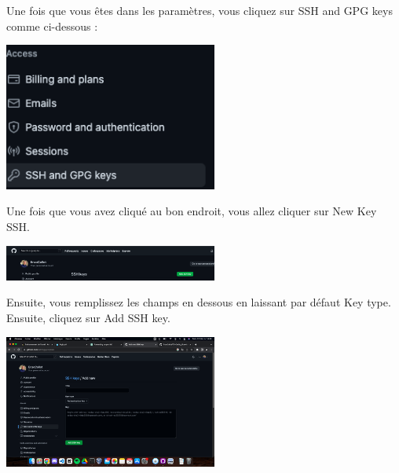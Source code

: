 \documentclass[12pt]{article}
\begin{document}
\vspace{0.3cm}

Une fois que vous êtes dans les paramètres, vous cliquez sur SSH and GPG keys comme ci-dessous :

\vspace{0.3cm}

\begin{center}
  \includegraphics[width=7cm]{Image-TD-Git-5/ssh-gpg.png}
\end{center}

Une fois que vous avez cliqué au bon endroit, vous allez cliquer sur New Key SSH.

\vspace{0.3cm}

\begin{center}
  \includegraphics[width=7cm]{Image-TD-Git-5/new-ssh-key.png}
\end{center}

\vspace{0.3cm}

Ensuite, vous remplissez les champs en dessous en laissant par défaut Key type. Ensuite, cliquez sur Add SSH key.

\vspace{0.3cm}

\begin{center}
  \includegraphics[width=7cm]{Image-TD-Git-5/ssh-key.png}
\end{center}
\end{document}
